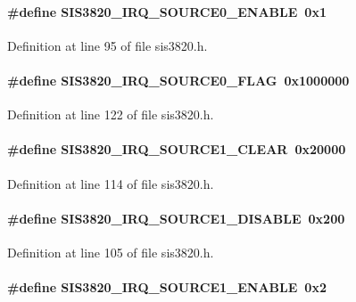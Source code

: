 \paragraph[{SIS3820\_\-IRQ\_\-SOURCE0\_\-ENABLE}]{\setlength{\rightskip}{0pt plus 5cm}\#define SIS3820\_\-IRQ\_\-SOURCE0\_\-ENABLE~0x1}\hfill\label{sis3820_8h_a9eb49c6f2402a42fe75b0598cd6b2644}


Definition at line 95 of file sis3820.h.
\paragraph[{SIS3820\_\-IRQ\_\-SOURCE0\_\-FLAG}]{\setlength{\rightskip}{0pt plus 5cm}\#define SIS3820\_\-IRQ\_\-SOURCE0\_\-FLAG~0x1000000}\hfill\label{sis3820_8h_a6337d7801f1675cb620963ff264476af}


Definition at line 122 of file sis3820.h.
\paragraph[{SIS3820\_\-IRQ\_\-SOURCE1\_\-CLEAR}]{\setlength{\rightskip}{0pt plus 5cm}\#define SIS3820\_\-IRQ\_\-SOURCE1\_\-CLEAR~0x20000}\hfill\label{sis3820_8h_adf1614c685ba2ea76ee1591a90a35d63}


Definition at line 114 of file sis3820.h.
\paragraph[{SIS3820\_\-IRQ\_\-SOURCE1\_\-DISABLE}]{\setlength{\rightskip}{0pt plus 5cm}\#define SIS3820\_\-IRQ\_\-SOURCE1\_\-DISABLE~0x200}\hfill\label{sis3820_8h_a6396a90191139012a1101f02be9b3dc9}


Definition at line 105 of file sis3820.h.
\paragraph[{SIS3820\_\-IRQ\_\-SOURCE1\_\-ENABLE}]{\setlength{\rightskip}{0pt plus 5cm}\#define SIS3820\_\-IRQ\_\-SOURCE1\_\-ENABLE~0x2}\hfill\label{sis3820_8h_a76000572ddb572907a2ffb954ad22741}


